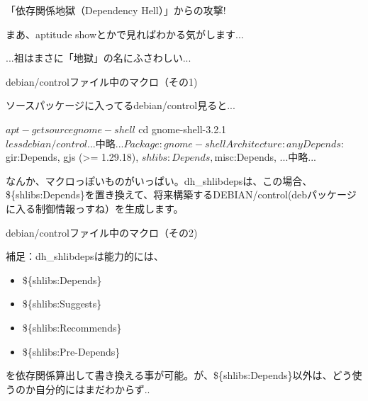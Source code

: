 \begin{frame}[containsverbatim]{「依存関係地獄（Dependency Hell）」からの攻撃!}

まあ、aptitude showとかで見ればわかる気がします...


\begin{center}
\Large
...祖はまさに「地獄」の名にふさわしい...
\end{center}


\end{frame}

\begin{frame}[containsverbatim]{debian/controlファイル中のマクロ（その1)}

ソースパッケージに入ってるdebian/control見ると...

\begin{commandline}
$ apt-get source gnome-shell
$ cd gnome-shell-3.2.1
$ less debian/control
...中略...
Package: gnome-shell
Architecture: any
Depends: ${gir:Depends},
         gjs (>= 1.29.18),
         ${shlibs:Depends},
         ${misc:Depends},
...中略...
\end{commandline}

なんか、マクロっぽいものがいっぱい。dh\_shlibdepsは、この場合、
\$\{shlibs:Depends\}を置き換えて、将来構築するDEBIAN/control(debパッケージに入る制御情報っすね）を生成します。
\end{frame}

\begin{frame}[containsverbatim]{debian/controlファイル中のマクロ（その2)}

補足：dh\_shlibdepsは能力的には、
\begin{itemize}
\item \$\{shlibs:Depends\}
\item \$\{shlibs:Suggests\}
\item \$\{shlibs:Recommends\}
\item \$\{shlibs:Pre-Depends\}
\end{itemize}

を依存関係算出して書き換える事が可能。が、\$\{shlibs:Depends\}以外は、どう使うのか自分的にはまだわからず..

\end{frame}


